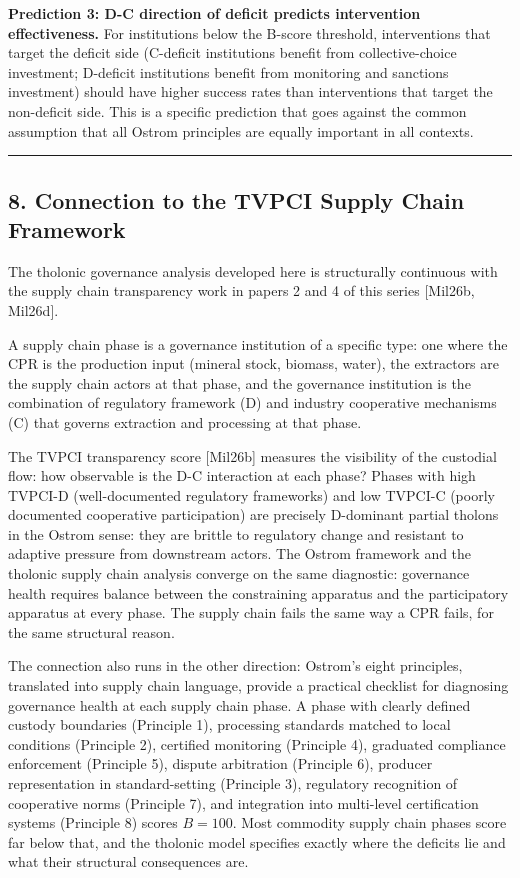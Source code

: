 \documentclass[
  11pt,
  letterpaper,
]{article}
\begin{document}
\textbf{Prediction 3: D-C direction of deficit predicts intervention
effectiveness.} For institutions below the B-score threshold,
interventions that target the deficit side (C-deficit institutions
benefit from collective-choice investment; D-deficit institutions
benefit from monitoring and sanctions investment) should have higher
success rates than interventions that target the non-deficit side. This
is a specific prediction that goes against the common assumption that
all Ostrom principles are equally important in all contexts.

\begin{center}\rule{0.5\linewidth}{0.5pt}\end{center}

\subsection{8. Connection to the TVPCI Supply Chain
Framework}\label{connection-to-the-tvpci-supply-chain-framework}

The tholonic governance analysis developed here is structurally
continuous with the supply chain transparency work in papers 2 and 4 of
this series {[}Mil26b, Mil26d{]}.

A supply chain phase is a governance institution of a specific type: one
where the CPR is the production input (mineral stock, biomass, water),
the extractors are the supply chain actors at that phase, and the
governance institution is the combination of regulatory framework (D)
and industry cooperative mechanisms (C) that governs extraction and
processing at that phase.

The TVPCI transparency score {[}Mil26b{]} measures the visibility of the
custodial flow: how observable is the D-C interaction at each phase?
Phases with high TVPCI-D (well-documented regulatory frameworks) and low
TVPCI-C (poorly documented cooperative participation) are precisely
D-dominant partial tholons in the Ostrom sense: they are brittle to
regulatory change and resistant to adaptive pressure from downstream
actors. The Ostrom framework and the tholonic supply chain analysis
converge on the same diagnostic: governance health requires balance
between the constraining apparatus and the participatory apparatus at
every phase. The supply chain fails the same way a CPR fails, for the
same structural reason.

The connection also runs in the other direction: Ostrom's eight
principles, translated into supply chain language, provide a practical
checklist for diagnosing governance health at each supply chain phase. A
phase with clearly defined custody boundaries (Principle 1), processing
standards matched to local conditions (Principle 2), certified
monitoring (Principle 4), graduated compliance enforcement (Principle
5), dispute arbitration (Principle 6), producer representation in
standard-setting (Principle 3), regulatory recognition of cooperative
norms (Principle 7), and integration into multi-level certification
systems (Principle 8) scores \(B = 100\). Most commodity supply chain
phases score far below that, and the tholonic model specifies exactly
where the deficits lie and what their structural consequences are.
\end{document}
